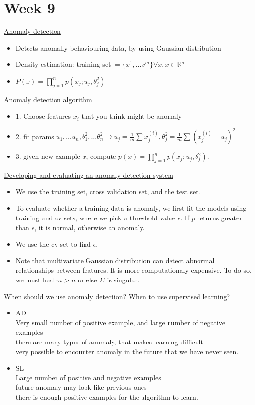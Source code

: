 \documentclass[12pt]{article}
\begin{document}
\newpage\section*{Week 9}

\underline{Anomaly detection}
\begin{itemize}
	\item Detects anomally behaviouring data, by using Gaussian distribution
	\item Density estimation: training set $= \{x^1,\ldots x^m\} \forall x, x\in \mathbb{R}^{n}$
	\item $P(x) = \prod_{j=1}^{n} p(x_j;u_j,\theta_j^2)$
\end{itemize}

\underline{Anomaly detection algorithm}
\begin{itemize}
	\item 1. Choose features $x_i$ that you think might be anomaly
	\item 2. fit params $u_1,\ldots u_n,\theta^2_1,\ldots\theta_n^2 \to u_j=\frac{1}{m}\sum x_j^{(i)}, \theta_j^2=\frac{1}{m}\sum(x_j^{(i)} -u_j)^2$
	\item 3. given new example $x$, compute $p(x)= \prod_{j=1}^{n} p(x_j;u_j,\theta_j^2)$.
\end{itemize}

\underline{Developing and evaluating an anomaly detection system}
\begin{itemize}
	\item We use the training set, cross validation set, and the test set.
	\item To evaluate whether a training data is anomaly, we first fit the models using training and cv sets, where we pick a threshold value $\epsilon$. If $p$ returns greater than $\epsilon$, it is normal, otherwise an anomaly.
	\item We use the cv set to find $\epsilon$.
	\item Note that multivariate Gaussian distribution can detect abnormal relationships between features. It is more computationaly expensive. To do so, we must had $m>n$ or else $\Sigma$ is singular.
\end{itemize}

\underline{When should we use anomaly detection? When to use supervised learning?}
\begin{itemize}
	\item AD\\
	Very small number of positive example, and large number of negative examples\\
	there are many types of anomaly, that makes learning difficult\\
	very possible to encounter anomaly in the future that we have never seen.
	\item SL\\
	Large number of positive and negative examples\\
	future anomaly may look like previous ones\\
	there is enough positive examples for the algorithm to learn.
	
\end{itemize}
\end{document}
